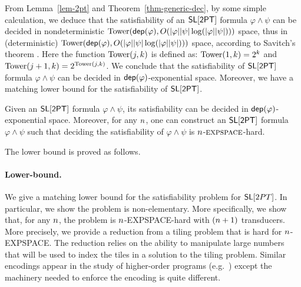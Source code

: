 From Lemma~\ref{lem-2pt} and Theorem~\ref{thm-generic-dec}, by some simple calculation, we deduce that the satisfiability of an $\textsf{SL}[\textsf{2PT}]$ formula $\varphi \wedge \psi$ can be decided in 
nondeterministic $\mathrm{Tower}(\mathsf{dep}(\varphi), O(|\varphi| |\psi| \log(|\varphi| |\psi|) ))$ space, thus in (deterministic) $\mathrm{Tower}(\mathsf{dep}(\varphi), O(|\varphi| |\psi| \log(|\varphi| |\psi|) ))$ space, according to Savitch's theorem \cite{Savitch70}. Here the function $\mathrm{Tower}(j, k)$ is %
defined as: $\mathrm{Tower}(1, k)= 2^k$ and $\mathrm{Tower}(j+1, k) = 2^{\mathrm{Tower}(j, k)}$. We conclude that the satisfiability of $\textsf{SL}[\textsf{2PT}]$ formula $\varphi \wedge \psi$ can be decided in $\mathsf{dep}(\varphi)$-exponential space.
Moreover, we have a matching lower bound for the satisfiability of $\textsf{SL}[\textsf{2PT}]$.
%
\begin{theorem}
Given an $\textsf{SL}[\textsf{2PT}]$ formula $\varphi \wedge \psi$, its satisfiability can be decided in $\mathsf{dep}(\varphi)$-exponential space. Moreover,  for any $n$, one can construct an  $\textsf{SL}[\textsf{2PT}]$ formula $\varphi \wedge \psi$ such that deciding the satisfiability of $\varphi \wedge \psi$  %
is $n$-$\textsc{expspace}$-hard.
\end{theorem}

The lower bound is proved as follows. 


\paragraph{Lower-bound.}

We give a matching lower bound for the satisfiability problem for $\mathsf{SL}[2PT]$. 
In particular, we show the problem is non-elementary.
More specifically, we show that, for any $n$, the problem is $n$-EXPSPACE-hard with $(n+1)$ transducers. 
More precisely, we provide a  reduction from a tiling problem that is hard for $n$-EXPSPACE.
The reduction relies on the ability to manipulate large numbers that will be used to index the tiles in a solution to the tiling problem.
Similar encodings appear in the study of higher-order programs (e.g.~\cite{J01,CW07}) except the machinery needed to enforce the encoding is quite different.

